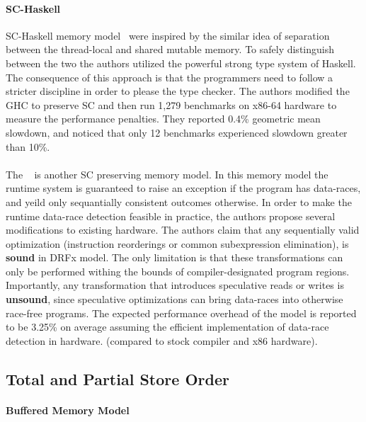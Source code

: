 \paragraph{SC-Haskell}

SC-Haskell memory model~\cite{Vollmer-al:PPoPP17}
were inspired by the similar idea of separation
between the thread-local and shared mutable memory. 
To safely distinguish between the two 
the authors utilized the powerful strong type system of Haskell. 
The consequence of this approach is that the 
programmers need to follow a stricter discipline 
in order to please the type checker. 
The authors modified the GHC to preserve SC 
and then run 1,279 benchmarks on x86-64 hardware
to measure the performance penalties.
They reported 0.4\% geometric mean slowdown,
and noticed that only 12 benchmarks experienced 
slowdown greater than 10\%.

\paragraph{\DRFx}

The \DRFx~\cite{Marino-al:PLDI10} is another 
SC preserving memory model. In this memory model
the runtime system is guaranteed to raise 
an exception if the program has data-races, 
and yeild only sequantially consistent outcomes otherwise.
In order to make the runtime data-race detection feasible 
in practice, the authors propose several modifications 
to existing hardware.
The authors claim that any sequentially valid optimization 
(\eg instruction reorderings or common subexpression elimination),
is \textbf{sound} in DRFx model.
The only limitation is that these transformations can only be performed
withing the bounds of compiler-designated program regions.
Importantly, any transformation that introduces 
speculative reads or writes is \textbf{unsound},
since speculative optimizations can bring
data-races into otherwise race-free programs.
The expected performance overhead of the model 
is reported to be 3.25\% on average
assuming the efficient implementation 
of data-race detection in hardware. 
(compared to stock compiler and x86 hardware). 

\subsection{Total and Partial Store Order}

\paragraph{Buffered Memory Model}


